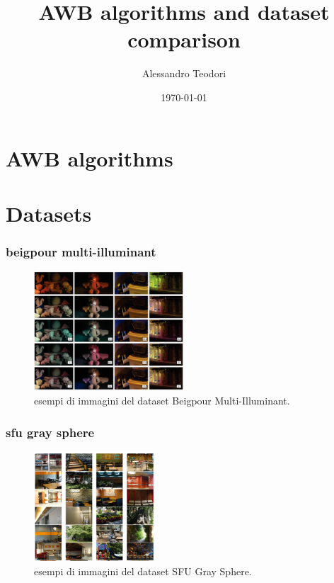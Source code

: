 \documentclass[aspectratio=169]{beamer}
\title{AWB algorithms and dataset comparison}
\date{\today}
\author{Alessandro Teodori}
\begin{document}
  \maketitle
  \section{AWB algorithms}
    \begin{frame}
      
    \end{frame}
  \section{Datasets}
    \begin{frame}
      
    \end{frame}
    
    \begin{frame}
    \frametitle{beigpour multi-illuminant}
      
      \begin{figure}[h]
        \centering
        \includegraphics[width=0.5\textwidth]{img/beigpour-dataset-sample.png}
        \caption{esempi di immagini del dataset Beigpour Multi-Illuminant.}
        \label{fig:beigpour-dataset-sample}
      \end{figure}
    \end{frame}

    \begin{frame}
      \frametitle{sfu gray sphere}

      \begin{figure}[h]
        \centering
        \includegraphics[width=0.4\textwidth]{img/sfu-dataset-sample.png}
        \caption{esempi di immagini del dataset SFU Gray Sphere.}
        \label{fig:sfu-dataset-sample}
      \end{figure}
    \end{frame}
\end{document}
